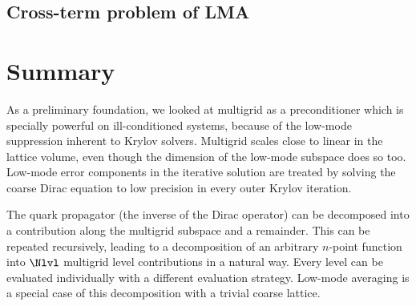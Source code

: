 
\subsection{Cross-term problem of LMA}



\section{Summary}
\label{sec:mg:summary}

As a preliminary foundation, we looked at multigrid as a preconditioner which is specially powerful on ill-conditioned systems, because of the low-mode suppression inherent to Krylov solvers.
Multigrid scales close to linear in the lattice volume, even though the dimension of the low-mode subspace does so too.
Low-mode error components in the iterative solution are treated by solving the coarse Dirac equation to low precision in every outer Krylov iteration.

The quark propagator (the inverse of the Dirac operator) can be decomposed into a contribution along the multigrid subspace and a remainder.
This can be repeated recursively, leading to a decomposition of an arbitrary $n$-point function into $\Nlvl$ multigrid level contributions in a natural way.
Every level can be evaluated individually with a different evaluation strategy.
Low-mode averaging is a special case of this decomposition with a trivial coarse lattice.

